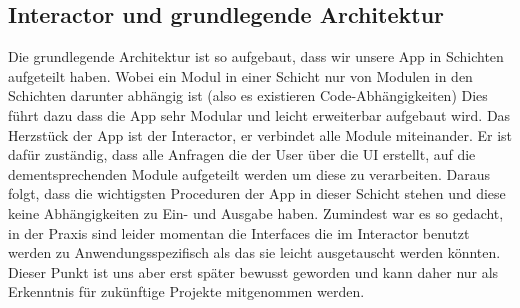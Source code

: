\subsection{Interactor und grundlegende Architektur}
Die grundlegende Architektur ist so aufgebaut, dass wir unsere App in Schichten aufgeteilt haben. Wobei ein Modul in einer Schicht nur von Modulen in den Schichten darunter abhängig ist (also es existieren Code-Abhängigkeiten) Dies führt dazu dass die App sehr Modular und leicht erweiterbar aufgebaut wird. Das Herzstück der App ist der Interactor, er verbindet alle Module miteinander.  Er ist dafür zuständig, dass alle Anfragen die der User über die UI erstellt, auf die dementsprechenden Module aufgeteilt werden um diese zu verarbeiten. Daraus folgt, dass die wichtigsten Proceduren der App in dieser Schicht stehen und diese keine Abhängigkeiten zu Ein- und Ausgabe haben. Zumindest war es so gedacht, in der Praxis sind leider momentan die Interfaces die im Interactor benutzt werden zu Anwendungsspezifisch als das sie leicht ausgetauscht werden könnten. Dieser Punkt ist uns aber erst später bewusst geworden und kann daher nur als Erkenntnis für zukünftige Projekte mitgenommen werden.